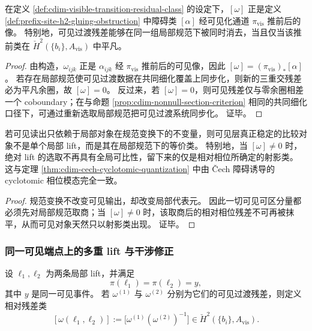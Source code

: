 \begin{proposition}\label{prop:cdim-visible-phase-residual-triviality}
在定义 \ref{def:cdim-visible-transition-residual-class} 的设定下，\([\omega]\) 正是定义 \ref{def:prefix-site-h2-gluing-obstruction} 中障碍类 \([\alpha]\) 经可见化通道 \(\pi_{\mathrm{vis}}\) 推前后的像。
特别地，可见过渡残差能够在同一组局部规范下被同时消去，当且仅当该推前类在 \(\check H^2(\{b_i\},A_{\mathrm{vis}})\) 中平凡。
\end{proposition}
\begin{proof}
由构造，\(\omega_{ijk}\) 正是 \(\alpha_{ijk}\) 经 \(\pi_{\mathrm{vis}}\) 推前后的可见像，因此 \([\omega]=(\pi_{\mathrm{vis}})_*[\alpha]\)。
若存在局部规范使可见过渡数据在共同细化覆盖上同步化，则新的三重交残差必为平凡余圈，故 \([\omega]=0\)。
反过来，若 \([\omega]=0\)，则可见残差仅与零余圈相差一个 coboundary；在与命题 \ref{prop:cdim-nonnull-section-criterion} 相同的共同细化口径下，可通过重新选取局部规范把可见过渡系统同步化。
证毕。
\end{proof}

\begin{corollary}[可见态的射影化]\label{cor:cdim-visible-state-projectivization}
若可见读出只依赖于局部对象在规范变换下的不变量，则可见层真正稳定的比较对象不是单个局部 lift，而是其在局部规范下的等价类。
特别地，当 \([\omega]\neq 0\) 时，绝对 lift 的选取不再具有全局可比性，留下来的仅是相对相位所确定的射影类。
这与定理 \ref{thm:cdim-cech-cyclotomic-quantization} 中由 \v{C}ech 障碍诱导的 cyclotomic 相位模态完全一致。
\end{corollary}
\begin{proof}
规范变换不改变可见输出，却改变局部代表元。
因此一切可见可区分量都必须先对局部规范取商；当 \([\omega]\neq 0\) 时，该取商后的相对相位残差不可再被抹平，从而可见对象天然只以射影类出现。
证毕。
\end{proof}

\subsubsection{同一可见端点上的多重 lift 与干涉修正}
设 \(\ell_1,\ell_2\) 为两条局部 lift，并满足
\[
\pi(\ell_1)=\pi(\ell_2)=y,
\]
其中 \(y\) 是同一可见事件。
若 \(\omega^{(1)}\) 与 \(\omega^{(2)}\) 分别为它们的可见过渡残差，则定义相对残差类
\[
[\omega(\ell_1,\ell_2)]
:=
\bigl[\omega^{(1)}(\omega^{(2)})^{-1}\bigr]
\in \check H^2(\{b_i\},A_{\mathrm{vis}}).
\]

